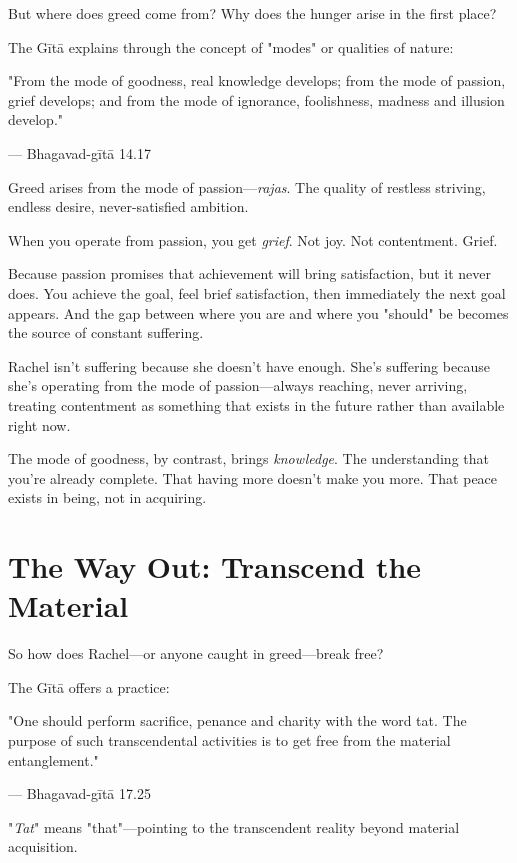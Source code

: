 \documentclass[11pt,twoside]{book}
\begin{document}
But where does greed come from? Why does the hunger arise in the first place?

The Gītā explains through the concept of "modes" or qualities of nature:

\begin{pullquote}
"From the mode of goodness, real knowledge develops; from the mode of passion, grief develops; and from the mode of ignorance, foolishness, madness and illusion develop."

--- Bhagavad-gītā 14.17
\end{pullquote}

Greed arises from the mode of passion—\textit{rajas}. The quality of restless striving, endless desire, never-satisfied ambition.

When you operate from passion, you get \emph{grief}. Not joy. Not contentment. Grief.

Because passion promises that achievement will bring satisfaction, but it never does. You achieve the goal, feel brief satisfaction, then immediately the next goal appears. And the gap between where you are and where you "should" be becomes the source of constant suffering.

Rachel isn't suffering because she doesn't have enough. She's suffering because she's operating from the mode of passion—always reaching, never arriving, treating contentment as something that exists in the future rather than available right now.

The mode of goodness, by contrast, brings \emph{knowledge}. The understanding that you're already complete. That having more doesn't make you more. That peace exists in being, not in acquiring.

\section*{The Way Out: Transcend the Material}

So how does Rachel—or anyone caught in greed—break free?

The Gītā offers a practice:

\begin{pullquote}
"One should perform sacrifice, penance and charity with the word tat. The purpose of such transcendental activities is to get free from the material entanglement."

--- Bhagavad-gītā 17.25
\end{pullquote}

"\textit{Tat}" means "that"—pointing to the transcendent reality beyond material acquisition.
\end{document}
